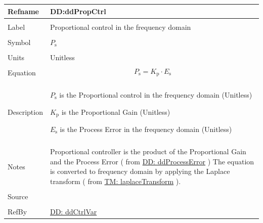 \documentclass[12pt]{article}
\begin{document}
\vspace{\baselineskip}
\noindent
\begin{minipage}{\textwidth}
\begin{tabular}{>{\raggedright}p{}>{\raggedright\arraybackslash}p{}}
\toprule \textbf{Refname} & \textbf{DD:ddPropCtrl}
\label{DD:ddPropCtrl}
\\ \midrule \\
Label & Proportional control in the frequency domain
        
\\ \midrule \\
Symbol & ${P_{\text{s}}}$
         
\\ \midrule \\
Units & Unitless
        
\\ \midrule \\
Equation & \begin{displaymath}
           {P_{\text{s}}}={K_{\text{p}}}\cdot{}{E_{\text{s}}}
           \end{displaymath}
\\ \midrule \\
Description & \begin{symbDescription}
              \item{${P_{\text{s}}}$ is the Proportional control in the frequency domain (Unitless)}
              \item{${K_{\text{p}}}$ is the Proportional Gain (Unitless)}
              \item{${E_{\text{s}}}$ is the Process Error in the frequency domain (Unitless)}
              \end{symbDescription}
\\ \midrule \\
Notes & Proportional controller is the product of the Proportional Gain and the Process Error ( from  \hyperref[DD:ddProcessError]{DD: ddProcessError} ) The equation is converted to frequency domain by applying the Laplace transform ( from \hyperref[TM:laplaceTransform]{TM: laplaceTransform} ).
        
\\ \midrule \\
Source & \cite{johnson2008}
         
\\ \midrule \\
RefBy & \hyperref[DD:ddCtrlVar]{DD: ddCtrlVar}
        
\\ \bottomrule
\end{tabular}
\end{minipage}
\end{document}
